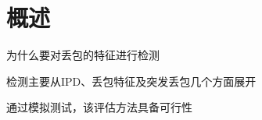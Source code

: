 \section{概述}
\label{chap:analyze:overview}

为什么要对丢包的特征进行检测

检测主要从IPD、丢包特征及突发丢包几个方面展开

通过模拟测试，该评估方法具备可行性